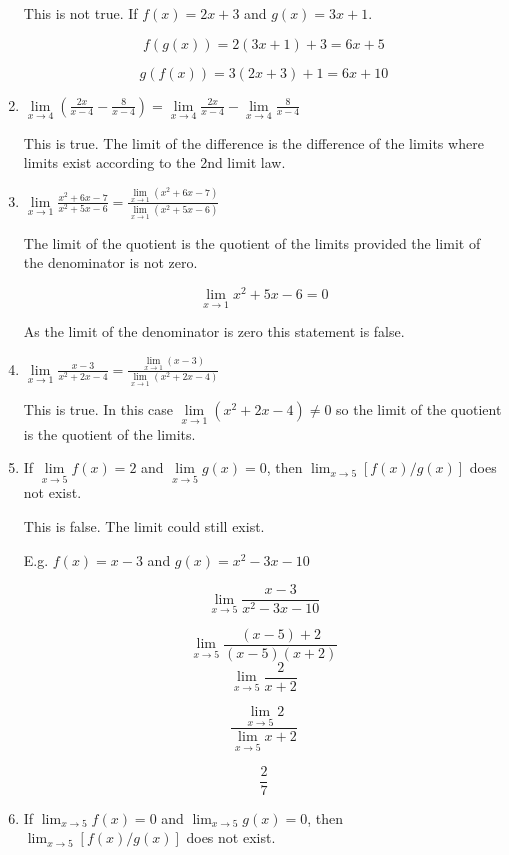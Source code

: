 \documentclass{article}
\begin{document}
\begin{enumerate}
		This is not true. If $f(x) = 2x + 3$ and $g(x) = 3x + 1$.

		$$f(g(x)) = 2(3x + 1) + 3 = 6x + 5$$

		$$g(f(x)) = 3(2x + 3) + 1 = 6x + 10$$

	\item $\lim \limits _{x \to 4} (\frac{2x}{x-4} - \frac{8}{x-4}) =
		\lim \limits _{x \to 4} \frac{2x}{x-4} - \lim \limits _{x \to 4} \frac{8}{x-4}$

		This is true. The limit of the difference is the difference of the limits where
		limits exist according to the 2nd limit law.

	\item $\lim \limits _{x \to 1} \frac{x^2 + 6x -7}{x^2 + 5x - 6} = 
		\frac{\lim \limits _{x \to 1} (x^2 + 6x -7)}{\lim \limits _{x \to 1} (x^2 + 5x - 6)}$

		The limit of the quotient is the quotient of the limits
		provided the limit of the denominator is not zero.

		$$\lim \limits _{x \to 1} x^2 + 5x - 6 = 0$$

		As the limit of the denominator is zero this statement is false.

	\item $\lim \limits _{x \to 1} \frac{x-3}{x^2 + 2x - 4} = 
		\frac{\lim \limits _{x \to 1} (x-3)}{\lim\limits _{x \to 1} (x^2 + 2x - 4)}$

		This is true. In this case $\lim \limits _{x \to 1} (x^2 + 2x - 4) \ne 0$ so
		the limit of the quotient is the quotient of the limits.

	\item If $\lim \limits _{x \to 5} f(x) = 2$ and $\lim \limits _{x \to 5} g(x) = 0$,
		then $\lim _{x \to 5} [f(x)/g(x)]$ does not exist.

		This is false. The limit could still exist.

		E.g. $f(x) = x - 3$ and $g(x) = x^2 - 3x - 10$

		$$\lim \limits _{x \to 5} \frac{x-3}{x^2 - 3x - 10}$$

		$$\lim \limits _{x \to 5} \frac{(x - 5) + 2}{(x-5)(x+2)}$$
		$$\lim \limits _{x \to 5} \frac{2}{x+2}$$

		$$\frac{\lim \limits _{x \to 5} 2}{\lim \limits _{x \to 5} x + 2}$$

		$$\frac{2}{7}$$

	\item If $\lim _{x \to 5} f(x) = 0$ and $\lim _{x \to 5} g(x) = 0$, then
		$\lim _{x \to 5} [f(x)/g(x)]$ does not exist.


\end{enumerate}
\end{document}
